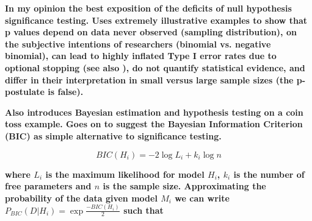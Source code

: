 \documentclass[12pt]{scrartcl}
\begin{document}
\begin{description}
  \item {}
  
  \item {}
   
  \item {}
  
  \item {}
  
  \item {}
  
  \item {}
  
  \item {}
  
  \item {}
  
  \item {}
    
  \item {}
  
  \textbf{In my opinion the best exposition of the deficits of null hypothesis significance testing. Uses extremely illustrative examples to show that p values depend on data never observed (sampling distribution), on the subjective intentions of researchers (binomial vs. negative binomial), can lead to highly inflated Type I error rates due to optional stopping (see also \cite{simmons2011false}), do not quantify statistical evidence, and differ in their interpretation in small versus large sample sizes (the p-postulate is false).}
  
  \textbf{Also introduces Bayesian estimation and hypothesis testing on a coin toss example. Goes on to suggest the Bayesian Information Criterion (BIC) as simple alternative to significance testing.}
  
  \begin{equation*}
    BIC(H_i) = -2 \log L_i + k_i \log n
  \end{equation*}
  
  \textbf{where $L_i$ is the maximum likelihood for model $H_i$, $k_i$ is the number of free parameters and $n$ is the sample size. Approximating the probability of the data given model $M_i$ we can write $P_{BIC}(D|H_i) = \exp{\frac{-BIC(H_i)}{2}}$ such that}
  

\end{description}
\end{document}
